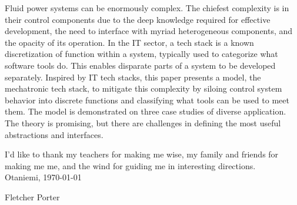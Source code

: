 \documentclass[english,12pt,a4paper,pdftex,eng,utf8]{aaltothesis}
\begin{document}

\begin{abstractpage}[english]
Fluid power systems can be enormously complex. The chiefest complexity is in their control components due to the deep knowledge required for effective development, the need to interface with myriad heterogeneous components, and the opacity of its operation. In the IT sector, a tech stack is a known discretization of function within a system, typically used to categorize what software tools do. This enables disparate parts of a system to be developed separately. Inspired by IT tech stacks, this paper presents a model, the mechatronic tech stack, to mitigate this complexity by siloing control system behavior into discrete functions and classifying what tools can be used to meet them. The model is demonstrated on three case studies of diverse application. The theory is promising, but there are challenges in defining the most useful abstractions and interfaces.
\end{abstractpage}

\newpage

I'd like to thank my teachers for making me wise, my family and friends for making me me, and the wind for guiding me in interesting directions. \\

\vspace{5cm}
Otaniemi, \today

\vspace{5mm}
{\hfill Fletcher Porter \hspace{1cm}}

\newpage
\end{document}
